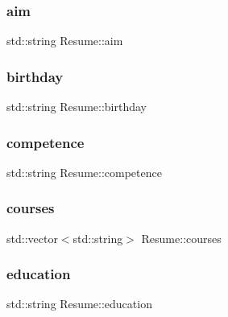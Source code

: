 \hypertarget{class_resume_ace4b574b42cdc210ed457987c045410a}{}\label{class_resume_ace4b574b42cdc210ed457987c045410a} 
\subsubsection{\texorpdfstring{aim}{aim}}
{\footnotesize\ttfamily std\+::string Resume\+::aim\hspace{0.3cm}{\ttfamily [private]}}

\hypertarget{class_resume_a0cfd6d3cfb1a1ce4409e24efb00c9eb1}{}\label{class_resume_a0cfd6d3cfb1a1ce4409e24efb00c9eb1} 
\subsubsection{\texorpdfstring{birthday}{birthday}}
{\footnotesize\ttfamily std\+::string Resume\+::birthday\hspace{0.3cm}{\ttfamily [private]}}

\hypertarget{class_resume_ac537d9f0cdc7dd3cb87f9d32d7653d22}{}\label{class_resume_ac537d9f0cdc7dd3cb87f9d32d7653d22} 
\subsubsection{\texorpdfstring{competence}{competence}}
{\footnotesize\ttfamily std\+::string Resume\+::competence\hspace{0.3cm}{\ttfamily [private]}}

\hypertarget{class_resume_afae66c6c6d6c04b721dce001d25e2d35}{}\label{class_resume_afae66c6c6d6c04b721dce001d25e2d35} 
\subsubsection{\texorpdfstring{courses}{courses}}
{\footnotesize\ttfamily std\+::vector$<$std\+::string$>$ Resume\+::courses\hspace{0.3cm}{\ttfamily [private]}}

\hypertarget{class_resume_a60f48cd7a2bb8a9dc44ab62bf8b55231}{}\label{class_resume_a60f48cd7a2bb8a9dc44ab62bf8b55231} 
\subsubsection{\texorpdfstring{education}{education}}
{\footnotesize\ttfamily std\+::string Resume\+::education\hspace{0.3cm}{\ttfamily [private]}}

